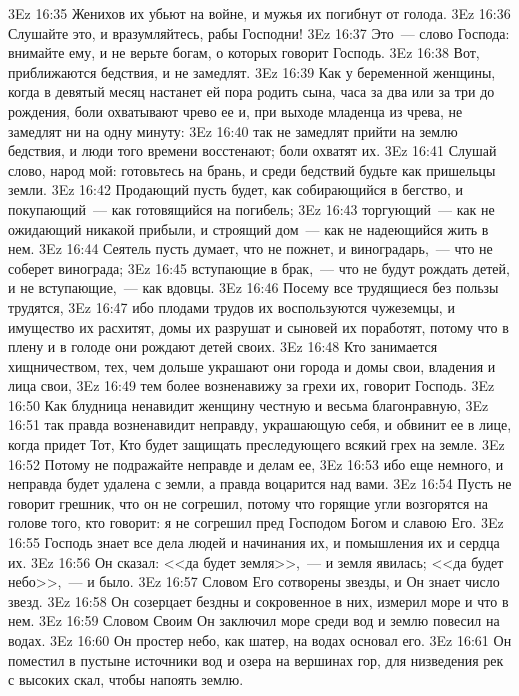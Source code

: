 \vs 3Ez 16:35 Женихов их убьют на войне, и мужья их погибнут от голода.
\vs 3Ez 16:36 Слушайте это, и вразумляйтесь, рабы Господни!
\vs 3Ez 16:37 Это~--- слово Господа: внимайте ему, и не верьте богам, о которых говорит Господь.
\vs 3Ez 16:38 Вот, приближаются бедствия, и не замедлят.
\vs 3Ez 16:39 Как у беременной женщины, когда в девятый месяц настанет ей пора родить сына, часа за два или за три до рождения, боли охватывают чрево ее и, при выходе младенца из чрева, не замедлят ни на одну минуту:
\vs 3Ez 16:40 так не замедлят прийти на землю бедствия, и люди того времени восстенают; боли охватят их.
\vs 3Ez 16:41 Слушай слово, народ мой: готовьтесь на брань, и среди бедствий будьте как пришельцы земли.
\vs 3Ez 16:42 Продающий пусть будет, как собирающийся в бегство, и покупающий~--- как готовящийся на погибель;
\vs 3Ez 16:43 торгующий~--- как не ожидающий никакой прибыли, и строящий дом~--- как не надеющийся жить в нем.
\vs 3Ez 16:44 Сеятель пусть думает, что не пожнет, и виноградарь,~--- что не соберет винограда;
\vs 3Ez 16:45 вступающие в брак,~--- что не будут рождать детей, и не вступающие,~--- как вдовцы.
\vs 3Ez 16:46 Посему все трудящиеся без пользы трудятся,
\vs 3Ez 16:47 ибо плодами трудов их воспользуются чужеземцы, и имущество их расхитят, домы их разрушат и сыновей их поработят, потому что в плену и в голоде они рождают детей своих.
\vs 3Ez 16:48 Кто занимается хищничеством, тех, чем дольше украшают они города и домы свои, владения и лица свои,
\vs 3Ez 16:49 тем более возненавижу за грехи их, говорит Господь.
\vs 3Ez 16:50 Как блудница ненавидит женщину честную и весьма благонравную,
\vs 3Ez 16:51 так правда возненавидит неправду, украшающую себя, и обвинит ее в лице, когда придет Тот, Кто будет защищать преследующего всякий грех на земле.
\vs 3Ez 16:52 Потому не подражайте неправде и делам ее,
\vs 3Ez 16:53 ибо еще немного, и неправда будет удалена с земли, а правда воцарится над вами.
\vs 3Ez 16:54 Пусть не говорит грешник, что он не согрешил, потому что горящие угли возгорятся на голове того, кто говорит: я не согрешил пред Господом Богом и славою Его.
\vs 3Ez 16:55 Господь знает все дела людей и начинания их, и помышления их и сердца их.
\vs 3Ez 16:56 Он сказал: <<да будет земля>>,~--- и земля явилась; <<да будет небо>>,~--- и было.
\vs 3Ez 16:57 Словом Его сотворены звезды, и Он знает число звезд.
\vs 3Ez 16:58 Он созерцает бездны и сокровенное в них, измерил море и что в нем.
\vs 3Ez 16:59 Словом Своим Он заключил море среди вод и землю повесил на водах.
\vs 3Ez 16:60 Он простер небо, как шатер, на водах основал его.
\vs 3Ez 16:61 Он поместил в пустыне источники вод и озера на вершинах гор, для низведения рек с высоких скал, чтобы напоять землю.
